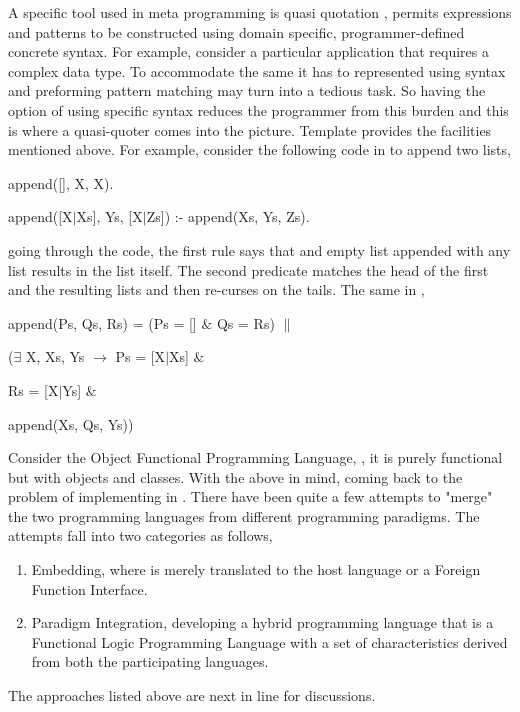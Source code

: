 \documentclass[proposal.tex]{subfiles}
\begin{document}
\par A specific tool used in meta programming is quasi quotation \cite{mainland2007s,haskellquasi,wikiquasi}, permits  expressions 
and patterns to be constructed using domain specific, programmer-defined concrete syntax. For example, consider a particular application that requires a 
complex data type. To accommodate the same it has to represented using  syntax and preforming pattern matching may turn into a 
tedious task. So having the option of using specific syntax reduces the programmer from this burden and this is where a quasi-quoter comes into the 
picture. Template  provides the facilities mentioned above. For example, consider the following code in  to append 
two lists,

\begin{listing}
append([], X, X).

append([X$\mid$Xs], Ys, [X$\mid$Zs]) :- append(Xs, Ys, Zs).
\end{listing}    

going through the code, the first rule says that and empty list appended with any list results in the list itself. The second predicate matches the head of the 
first and the resulting lists and then re-curses on the tails. The same in ,

\begin{listing}
append(Ps, Qs, Rs) = (Ps = []	$\&$ Qs = Rs) $\parallel$ 

($\exists$ X, Xs, Ys $\rightarrow$ Ps = [X$\mid$Xs] $\&$ 

Rs = [X$\mid$Ys] $\&$ 

append(Xs, Qs, Ys))
\end{listing}  

\par Consider the Object Functional Programming Language,  \cite{website:scala}, it is purely functional but with objects 
and classes. With the above in mind, coming back to the problem of implementing  in . There have been quite a few 
attempts to "merge" the two programming languages from different programming paradigms. The attempts fall into two categories as follows,

\begin{enumerate}
\item Embedding, where  is merely translated to the host language  or a Foreign Function Interface.

\item Paradigm Integration, developing a hybrid programming language that is a Functional Logic Programming Language with a set of characteristics 
derived from both the participating languages.
\end{enumerate}

The approaches listed above are next in line for discussions.  
\end{document}
